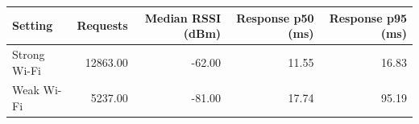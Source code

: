 \begin{tabular}{lrrrr}
\toprule
Setting & Requests & Median RSSI (dBm) & Response p50 (ms) & Response p95 (ms) \\
\midrule
Strong Wi-Fi & 12863.00 & -62.00 & 11.55 & 16.83 \\
Weak Wi-Fi & 5237.00 & -81.00 & 17.74 & 95.19 \\
\bottomrule
\end{tabular}
